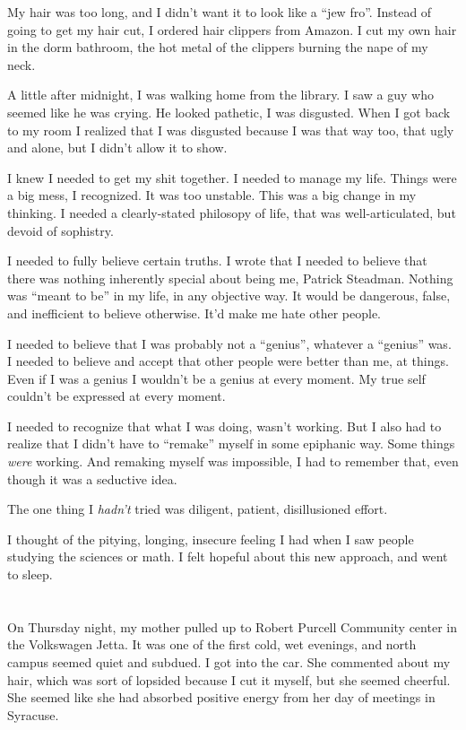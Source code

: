 My hair was too long, and I didn't want it to look like a ``jew fro''.  Instead of
going to get my hair cut, I ordered hair clippers from Amazon.  I cut my own
hair in the dorm bathroom, the hot metal of the clippers burning the nape of my
neck.  

A little after midnight, I was walking home from the library.  I saw a guy who
seemed like he was crying.  He looked pathetic, I was disgusted.  When I got
back to my room I realized that I was disgusted because I was that way too, that
ugly and alone, but I didn't allow it to show. 

I knew I needed to get my shit together.  I needed to manage my life.  Things
were a big mess, I recognized.  It was too unstable.  This was a big change in
my thinking.  I needed a clearly-stated philosopy of life, that was
well-articulated, but devoid of sophistry.

I needed to fully believe certain truths.  I wrote that I needed to believe that
there was nothing inherently special about being me, Patrick Steadman.  Nothing
was ``meant to be'' in my life, in any objective way.  It would be dangerous,
false, and inefficient to believe otherwise.  It'd make me hate other people.

I needed to believe that I was probably not a ``genius'', whatever a ``genius''
was.  I needed to believe and accept that other people were better than me, at
things.  Even if I was a genius I wouldn't be a genius at every moment.  My true
self couldn't be expressed at every moment.  

I needed to recognize that what I was doing, wasn't working.  But I also had to
realize that I didn't have to ``remake'' myself in some epiphanic way.  Some
things \textit{were} working.  And remaking myself was impossible, I had to
remember that, even though it was a seductive idea. 

The one thing I \textit{hadn't} tried was diligent, patient, disillusioned
effort.

I thought of the pitying, longing, insecure feeling I had when I saw people
studying the sciences or math.  I felt hopeful about this new approach, and went
to sleep. 

\section{}

On Thursday night, my mother pulled up to Robert Purcell Community center in the
Volkswagen Jetta.  It was one of the first cold, wet evenings, and north campus
seemed quiet and subdued.  I got into the car.  She commented about my hair,
which was sort of lopsided because I cut it myself, but she seemed cheerful.
She seemed like she had absorbed positive energy from her day of meetings in
Syracuse.  

